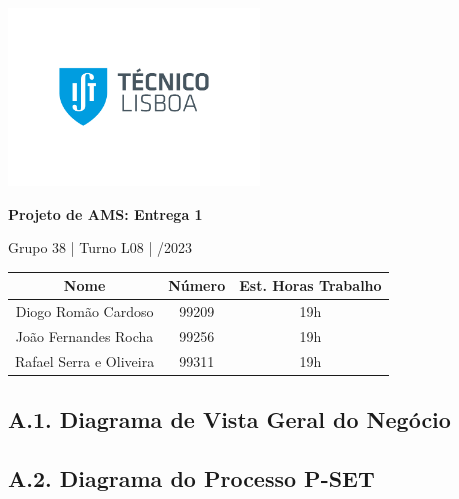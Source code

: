 \documentclass[12pt,a4paper]{article}
\begin{document}
\begin{titlepage}
	\begin{center}

		\vspace*{0.5cm}
		\includegraphics[width=0.5\textwidth]{ist-logo.png}

		\vspace{1cm}
		\Huge
		\textbf{Projeto de AMS: Entrega 1}

		\vspace{0.5cm}
		\LARGE
		Grupo 38 \quad | \quad Turno L08 \quad | /2023

		\vfill
	\end{center}

	\large
	\begin{tabular}{c|c|c}
		\textbf{Nome}           & \textbf{Número} & \textbf{Est. Horas Trabalho} \\
		\hline
		Diogo Romão Cardoso     & 99209           & 19h                          \\
		João Fernandes Rocha    & 99256           & 19h                          \\
		Rafael Serra e Oliveira & 99311           & 19h
	\end{tabular}

	\vspace{5cm}
\end{titlepage}

\begin{landscape}
	\section*{A.1. Diagrama de Vista Geral do Negócio}
	
\end{landscape}

\begin{landscape}
	\section*{A.2. Diagrama do Processo P-SET}
	
\end{landscape}
\end{document}
